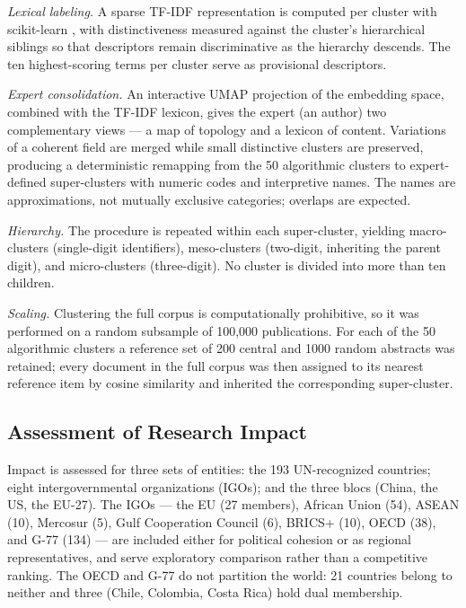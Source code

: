 \documentclass{article}
\let\cite\parencite
\begin{document}
	\textit{Lexical labeling.} A sparse TF-IDF representation is computed per cluster with scikit-learn \cite{pedregosa2011scikit}, with distinctiveness measured against the cluster's hierarchical siblings so that descriptors remain discriminative as the hierarchy descends. The ten highest-scoring terms per cluster serve as provisional descriptors.
	
	\textit{Expert consolidation.} An interactive UMAP projection of the embedding space, combined with the TF-IDF lexicon, gives the expert (an author) two complementary views --- a map of topology and a lexicon of content. Variations of a coherent field are merged while small distinctive clusters are preserved, producing a deterministic remapping from the 50 algorithmic clusters to expert-defined super-clusters with numeric codes and interpretive names. The names are approximations, not mutually exclusive categories; overlaps are expected.
	
	\textit{Hierarchy.} The procedure is repeated within each super-cluster, yielding macro-clusters (single-digit identifiers), meso-clusters (two-digit, inheriting the parent digit), and micro-clusters (three-digit). No cluster is divided into more than ten children.
	
	\textit{Scaling.} Clustering the full corpus is computationally prohibitive, so it was performed on a random subsample of 100,000 publications. For each of the 50 algorithmic clusters a reference set of 200 central and 1000 random abstracts was retained; every document in the full corpus was then assigned to its nearest reference item by cosine similarity and inherited the corresponding super-cluster.
	
	\subsection{Assessment of Research Impact}
	\label{national_reserach_authority}
	
	Impact is assessed for three sets of entities: the 193 UN-recognized countries; eight intergovernmental organizations (IGOs); and the three blocs (China, the US, the EU-27). The IGOs --- the EU (27 members), African Union (54), ASEAN (10), Mercosur (5), Gulf Cooperation Council (6), BRICS+ (10), OECD (38), and G-77 (134) --- are included either for political cohesion or as regional representatives, and serve exploratory comparison rather than a competitive ranking. The OECD and G-77 do not partition the world: 21 countries belong to neither and three (Chile, Colombia, Costa Rica) hold dual membership.
	
\end{document}
